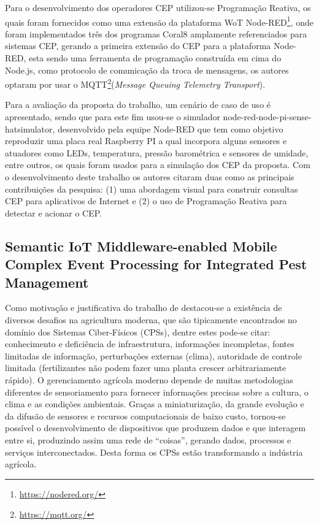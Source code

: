 \documentclass[ti,table]{texufpel} %
\begin{document}
    Para o desenvolvimento dos operadores CEP utilizou-se Programação Reativa, os quais foram fornecidos como uma extensão da plataforma WoT Node-RED\footnote{\url{https://nodered.org/}}, onde foram implementados três dos programas Coral8 amplamente referenciados para sistemas CEP, gerando a primeira extensão do CEP para a plataforma Node-RED, esta sendo uma ferramenta de programação construída em cima do Node.js, como protocolo de comunicação da troca de mensagens, os autores optaram por usar o MQTT\footnote{\url{https://mqtt.org/}}(\textit{Message Queuing Telemetry Transport}).      

     

    Para a avaliação da proposta do trabalho, um cenário de caso de uso é apresentado, sendo que para este fim usou-se o simulador node-red-node-pi-sense-hatsimulator, desenvolvido pela equipe Node-RED que tem como objetivo reproduzir uma placa real Raspberry PI a qual incorpora alguns sensores e atuadores como LEDs, temperatura, pressão barométrica e sensores de umidade, entre outros, os quais foram usados para a simulação dos CEP da proposta. Com o desenvolvimento deste trabalho os autores citaram duas como as principais contribuições da pesquisa: (1) uma abordagem visual para construir consultas CEP para aplicativos de Internet e (2) o uso de Programação Reativa para detectar e acionar o CEP. 

  

\subsection{Semantic IoT Middleware-enabled Mobile Complex Event Processing for Integrated Pest Management} 

  

  

    Como motivação e justificativa do trabalho de \cite{art3nocera2017semantic} destacou-se a existência de diversos desafios na agricultura moderna, que são tipicamente encontrados no domínio dos Sistemas Ciber-Físicos (CPSs), dentre estes pode-se citar: conhecimento e deficiência de infraestrutura, informações incompletas, fontes limitadas de informação, perturbações externas (clima), autoridade de controle limitada (fertilizantes não podem fazer uma planta crescer arbitrariamente rápido). O gerenciamento agrícola moderno depende de muitas metodologias diferentes de sensoriamento para fornecer informações precisas sobre a cultura, o clima e as condições ambientais. Graças a miniaturização, da grande evolução e da difusão de sensores e recursos computacionais de baixo custo, tornou-se possível o desenvolvimento de dispositivos que produzem dados e que interagem entre si, produzindo assim uma rede de ``coisas'', gerando dados, processos e serviços interconectados. Desta forma os CPSs estão transformando a indústria agrícola. 
\end{document}

